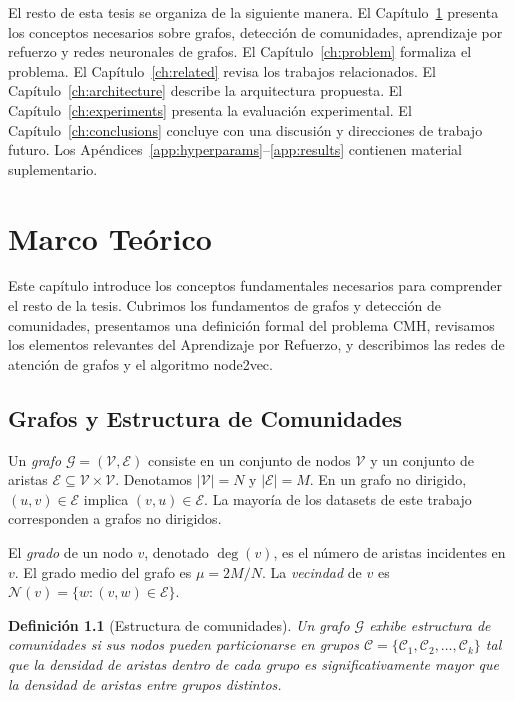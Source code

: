 \documentclass[11pt,a4paper,twoside]{tesis}
\newtheorem{definition}{Definición}[chapter]
\newcommand{\G}{\mathcal{G}}
\newcommand{\V}{\mathcal{V}}
\newcommand{\E}{\mathcal{E}}
\newcommand{\C}{\mathcal{C}}
\begin{document}
El resto de esta tesis se organiza de la siguiente manera. El
Capítulo~\ref{ch:background} presenta los conceptos necesarios sobre grafos, detección
de comunidades, aprendizaje por refuerzo y redes neuronales de grafos.
El Capítulo~\ref{ch:problem} formaliza el problema.
El Capítulo~\ref{ch:related} revisa los trabajos relacionados.
El Capítulo~\ref{ch:architecture} describe la arquitectura propuesta.
El Capítulo~\ref{ch:experiments} presenta la evaluación experimental.
El Capítulo~\ref{ch:conclusions} concluye con una discusión y direcciones de trabajo
futuro.
Los Apéndices~\ref{app:hyperparams}--\ref{app:results} contienen material suplementario.


\chapter{Marco Teórico}
\label{ch:background}

Este capítulo introduce los conceptos fundamentales necesarios para comprender el resto
de la tesis. Cubrimos los fundamentos de grafos y detección de comunidades, presentamos
una definición formal del problema CMH, revisamos los elementos relevantes del
Aprendizaje por Refuerzo, y describimos las redes de atención de grafos y el algoritmo
node2vec.

\section{Grafos y Estructura de Comunidades}
\label{sec:grafos}

Un \emph{grafo} $\G = (\V, \E)$ consiste en un conjunto de nodos $\V$ y un conjunto de
aristas $\E \subseteq \V \times \V$. Denotamos $|\V| = N$ y $|\E| = M$. En un grafo
no dirigido, $(u,v) \in \E$ implica $(v,u) \in \E$. La mayoría de los datasets de este
trabajo corresponden a grafos no dirigidos.

El \emph{grado} de un nodo $v$, denotado $\deg(v)$, es el número de aristas incidentes
en $v$. El grado medio del grafo es $\mu = 2M/N$. La \emph{vecindad} de $v$ es
$\mathcal{N}(v) = \{w : (v,w) \in \E\}$.

\begin{definition}[Estructura de comunidades]
Un grafo $\G$ exhibe \emph{estructura de comunidades} si sus nodos pueden particionarse
en grupos $\C = \{\C_1, \C_2, \ldots, \C_k\}$ tal que la densidad de aristas dentro de
cada grupo es significativamente mayor que la densidad de aristas entre grupos distintos.
\end{definition}
\end{document}
